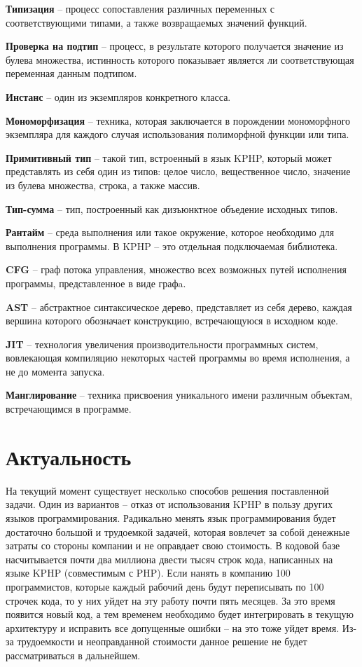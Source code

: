 \textbf{Типизация} -- процесс сопоставления различных переменных с соответствующими типами, а также возвращаемых значений функций.

\textbf{Проверка на подтип} -- процесс, в результате которого получается значение из булева множества, истинность которого показывает является ли соответствующая переменная данным подтипом.

\textbf{Инстанс} -- один из экземпляров конкретного класса.

\textbf{Мономорфизация} -- техника, которая заключается в порождении мономорфного экземпляра для каждого случая использования полиморфной функции или типа.

\textbf{Примитивный тип} -- такой тип, встроенный в язык KPHP, который может представлять из себя один из типов: целое число, вещественное число, значение из булева множества, строка, а также массив.

\textbf{Тип-сумма} -- тип, построенный как дизъюнктное объедение исходных типов.

\textbf{Рантайм} -- среда выполнения или такое окружение, которое необходимо для выполнения программы. В KPHP -- это отдельная подключаемая библиотека.

\textbf{CFG} -- граф потока управления, множество всех возможных путей исполнения программы, представленное в виде графa.

\textbf{AST} -- абстрактное синтаксическое дерево, представляет из себя дерево, каждая вершина которого обозначает конструкцию, встречающуюся в исходном коде.

\textbf{JIT} -- технология увеличения производительности программных систем, вовлекающая компиляцию некоторых частей программы во время исполнения, а не до момента запуска.

\textbf{Манглирование} -- техника присвоения уникального имени различным объектам, встречающимся в программе.

\section{Актуальность}
\label{sec:actuality}
На текущий момент существует несколько способов решения поставленной задачи.
Один из вариантов -- отказ от использования KPHP в пользу других языков программирования.
Радикально менять язык программирования будет достаточно большой и трудоемкой задачей, которая вовлечет за собой денежные затраты со стороны компании и не оправдает свою стоимость.
В кодовой базе насчитывается почти два миллиона двести тысяч строк кода, написанных на языке KPHP (совместимым с PHP).
Если нанять в компанию 100 программистов, которые каждый рабочий день будут переписывать по 100 строчек кода, то у них уйдет на эту работу почти пять месяцев.
За это время появится новый код, а тем временем необходимо будет интегрировать в текущую архитектуру и исправить все допущенные ошибки -- на это тоже уйдет время.
Из-за трудоемкости и неоправданной стоимости данное решение не будет рассматриваться в дальнейшем.

